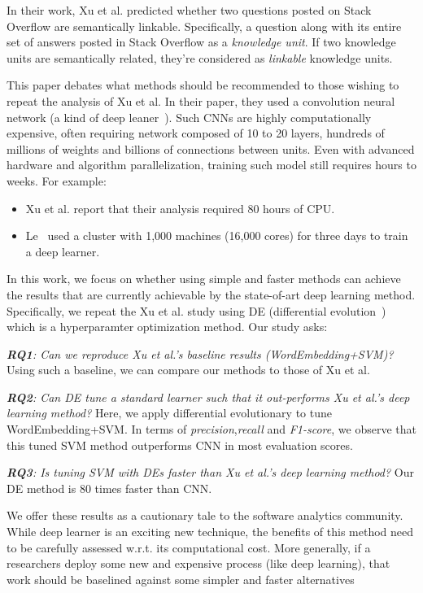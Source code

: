 \documentclass[sigconf,review, anonymous]{acmart}
\theoremstyle{break}
\newcommand{\bi}{\begin{itemize}[leftmargin=0.4cm]}
\newcommand{\ei}{\end{itemize}}
\begin{document}
 In their work, Xu et al. predicted whether two questions posted on Stack Overflow are semantically linkable. 
Specifically,  a question along with its entire set of answers posted in Stack Overflow
as a {\it knowledge unit}. If two knowledge units are semantically related, they're considered
as {\it linkable} knowledge units. 
 
This paper debates what methods should be recommended
to those wishing to repeat the analysis of   Xu et al.
In their paper, they used a convolution neural
network (a kind of deep leaner~\cite{lecun2015deep}). Such 
CNNs are highly computationally expensive,
often requiring network composed of 10 to 20 layers, hundreds of millions of weights and billions of connections between units. Even with
advanced hardware and algorithm parallelization, training such model still requires hours to weeks.
For example:
\bi
\item
Xu et al. report that their analysis
required 80 hours of CPU.
\item
Le~\cite{le2013building} used  a cluster with 1,000 machines (16,000 cores) for three days to train a deep learner.
\ei
In this work,  we focus on whether using simple and faster methods can achieve
the results that are currently achievable by the state-of-art deep learning method.
Specifically, we repeat the Xu et al.
study using  DE  (differential evolution~\cite{storn1997differential})
which is a hyperparamter optimization
method.
Our study asks:


{\it \textbf{RQ1}: Can we reproduce Xu et al.'s baseline results (WordEmbedding+SVM)?}
Using such a baseline, we can compare our methods to those of Xu et al.
 
 {\it \textbf{RQ2}: Can   DE   tune a standard learner such that
 it out-performs
  Xu et al.'s deep learning method?}
 Here,
we apply differential evolutionary  to tune 
WordEmbedding+SVM. In terms of {\it precision},{\it recall} and {\it F1-score}, we observe that this tuned SVM method outperforms CNN in most evaluation scores.

{\it \textbf{RQ3}: Is tuning SVM with DEs faster than Xu et al.'s deep learning method?}
Our   DE method
 is  $80$ times faster than CNN. 
 
We offer these results as a cautionary tale to the software analytics community.
While deep learner is an exciting new technique, the benefits of this
method need to be carefully assessed w.r.t. its computational cost. 
More generally,
if a researchers deploy some new and expensive process (like deep learning), that work should be baselined against some simpler and faster alternatives
 
\end{document}
